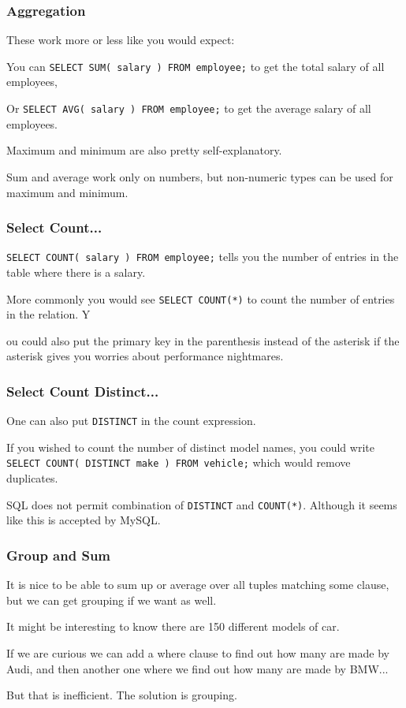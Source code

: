 \begin{frame}
\frametitle{Aggregation}

These work more or less like you would expect: 

You can \texttt{SELECT SUM( salary ) FROM employee;} to get the total salary of all employees, 

Or \texttt{SELECT AVG( salary ) FROM employee;} to get the average salary of all employees.

Maximum and minimum are also pretty self-explanatory. 

Sum and average work only on numbers, but non-numeric types can be used for maximum and minimum. 

\end{frame}


\begin{frame}
\frametitle{Select Count...}

\texttt{SELECT COUNT( salary ) FROM employee;} tells you the number of entries in the table where there is a salary. 

More commonly you would see \texttt{SELECT COUNT(*)} to count the number of entries in the relation. Y

ou could also put the primary key in the parenthesis instead of the asterisk if the asterisk gives you worries about performance nightmares.


\end{frame}



\begin{frame}
\frametitle{Select Count Distinct...}

One can also put \texttt{DISTINCT} in the count expression. 

If you wished to count the number of distinct model names, you could write \texttt{SELECT COUNT( DISTINCT make ) FROM vehicle;} which would remove duplicates.

SQL does not permit combination of \texttt{DISTINCT} and \texttt{COUNT(*)}. Although it seems like this is accepted by MySQL.

\end{frame}



\begin{frame}
\frametitle{Group and Sum}

It is nice to be able to sum up or average over all tuples matching some clause, but we can get grouping if we want as well. 

It might be interesting to know there are 150 different models of car. 

If we are curious we can add a where clause to find out how many are made by Audi, and then another one where we find out how many are made by BMW... 

But that is inefficient. The solution is grouping.


\end{frame}




